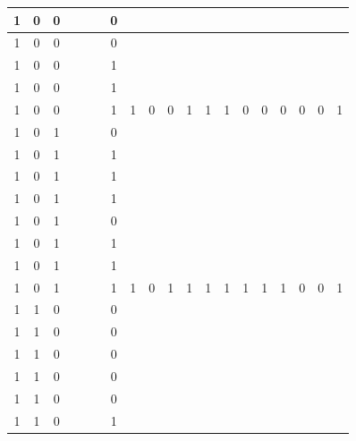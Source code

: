 \begin{table}[!tb]
\begin{tabular}{|c|c|c|c|c|c|c|c|c|c|c|c|c|c|c|c|c|c|c|}
        \rowcolor{yellow!40} 1 & 0 & 0 &  &  &  & 0 &  &  &  &  &  &  &  &  &  &  &  &  \\ \hline
        \rowcolor{yellow!40} 1 & 0 & 0 &  &  &  & 0 &  &  &  &  &  &  &  &  &  &  &  &  \\ \hline
        \rowcolor{yellow!40} 1 & 0 & 0 &  &  &  & 1 &  &  &  &  &  &  &  &  &  &  &  &  \\ \hline
        \rowcolor{yellow!40} 1 & 0 & 0 &  &  &  & 1 &  &  &  &  &  &  &  &  &  &  &  &  \\ \hline
        \rowcolor{yellow!40} 1 & 0 & 0 &  &  &  & 1 & 1 & 0 & 0 & 1 & 1 & 1 & 0 & 0 & 0 & 0 & 0 & 1 \\ \hline
        \rowcolor{gray!40} 1 & 0 & 1 &  &  &  & 0 &  &  &  &  &  &  &  &  &  &  &  &  \\ \hline
        \rowcolor{gray!40} 1 & 0 & 1 &  &  &  & 1 &  &  &  &  &  &  &  &  &  &  &  &  \\ \hline
        \rowcolor{gray!40} 1 & 0 & 1 &  &  &  & 1 &  &  &  &  &  &  &  &  &  &  &  &  \\ \hline
        \rowcolor{gray!40} 1 & 0 & 1 &  &  &  & 1 &  &  &  &  &  &  &  &  &  &  &  &  \\ \hline
        \rowcolor{gray!40} 1 & 0 & 1 &  &  &  & 0 &  &  &  &  &  &  &  &  &  &  &  &  \\ \hline
        \rowcolor{gray!40} 1 & 0 & 1 &  &  &  & 1 &  &  &  &  &  &  &  &  &  &  &  &  \\ \hline
        \rowcolor{gray!40} 1 & 0 & 1 &  &  &  & 1 &  &  &  &  &  &  &  &  &  &  &  &  \\ \hline
        \rowcolor{gray!40} 1 & 0 & 1 &  &  &  & 1 & 1 & 0 & 1 & 1 & 1 & 1 & 1 & 1 & 1 & 0 & 0 & 1 \\ \hline
        \rowcolor{blue!40} 1 & 1 & 0 &  &  &  & 0 &  &  &  &  &  &  &  &  &  &  &  &  \\ \hline
        \rowcolor{blue!40} 1 & 1 & 0 &  &  &  & 0 &  &  &  &  &  &  &  &  &  &  &  &  \\ \hline
        \rowcolor{blue!40} 1 & 1 & 0 &  &  &  & 0 &  &  &  &  &  &  &  &  &  &  &  &  \\ \hline
        \rowcolor{blue!40} 1 & 1 & 0 &  &  &  & 0 &  &  &  &  &  &  &  &  &  &  &  &  \\ \hline
        \rowcolor{blue!40} 1 & 1 & 0 &  &  &  & 0 &  &  &  &  &  &  &  &  &  &  &  &  \\ \hline
        \rowcolor{blue!40} 1 & 1 & 0 &  &  &  & 1 &  &  &  &  &  &  &  &  &  &  &  &  \\ \hline

\end{tabular}
\end{table}
